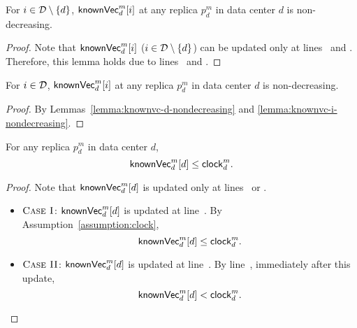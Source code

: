 \begin{applemma} \label{lemma:knownvc-i-nondecreasing}
  For $i \in \mathcal{D} \setminus \{d\}$,
  ${\sf knownVec}^{m}_{d}[i]$ at any replica $p^{m}_{d}$ in data center $d$
  is non-decreasing.
\end{applemma}

\begin{proof} \label{proof:knownvc-i-nondecreasing}
  Note that ${\sf knownVec}^{m}_{d}[i]$ ($i \in \mathcal{D} \setminus \{d\}$)
  can be updated only
  at lines~\code{\ref{alg:unistore-replication}}{\ref{line:replicate-knownvc}}
  and \code{\ref{alg:unistore-replication}}{\ref{line:heartbeat-knownvc}}.
  Therefore, this lemma holds due to
  lines~\code{\ref{alg:unistore-replication}}{\ref{line:replicate-precondition}}
  and \code{\ref{alg:unistore-replication}}{\ref{line:heartbeat-precondition}}.
\end{proof}

\begin{applemma} \label{lemma:knownvc-nondecreasing}
  For $i \in \mathcal{D}$, ${\sf knownVec}^{m}_{d}[i]$ at any replica $p^{m}_{d}$
  in data center $d$ is non-decreasing.
\end{applemma}

\begin{proof} \label{proof:knownvc-nondecreasing}
  By Lemmas~\ref{lemma:knownvc-d-nondecreasing}
  and \ref{lemma:knownvc-i-nondecreasing}.
\end{proof}

\begin{applemma} \label{lemma:knownvc-d-clock}
  For any replica $p^{m}_{d}$ in data center $d$,
  \[
    {\sf knownVec}^{m}_{d}[d] \le {\sf clock}^{m}_{d}.
  \]
\end{applemma}

\begin{proof} \label{proof:knownvc-d-clock}
  Note that ${\sf knownVec}^{m}_{d}[d]$ is updated only
  at lines~\code{\ref{alg:unistore-replication}}{\ref{line:propagate-knownvc-clock}}
  or \code{\ref{alg:unistore-replication}}{\ref{line:propagate-knownvc-ts}}.
  \begin{itemize}
    \item $\textsc{Case I}$: ${\sf knownVec}^{m}_{d}[d]$ is updated
      at line~\code{\ref{alg:unistore-replication}}{\ref{line:propagate-knownvc-clock}}.
      By Assumption~\ref{assumption:clock},
      \[
        {\sf knownVec}^{m}_{d}[d] \le {\sf clock}^{m}_{d}.
      \]
    \item $\textsc{Case II}$: ${\sf knownVec}^{m}_{d}[d]$ is updated
      at line~\code{\ref{alg:unistore-replication}}{\ref{line:propagate-knownvc-ts}}.
      By line~\code{\ref{alg:unistore-replica}}{\ref{line:preparecausal-ts}},
      immediately after this update,
      \[
        {\sf knownVec}^{m}_{d}[d] < {\sf clock}^{m}_{d}.
      \]
  \end{itemize}
\end{proof}

